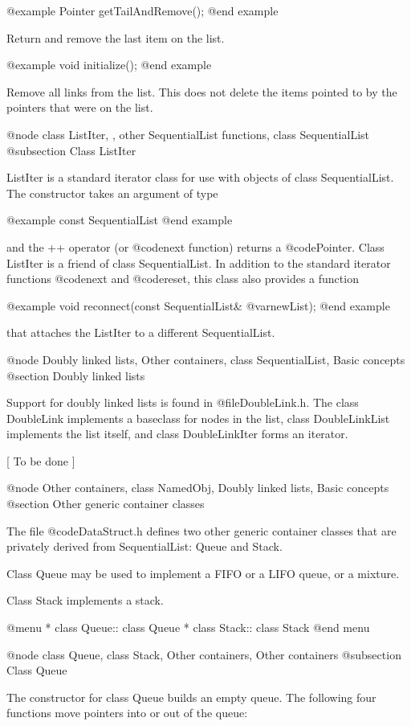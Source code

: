 @example
Pointer getTailAndRemove();
@end example

Return and remove the last item on the list.

@example
void initialize();
@end example

Remove all links from the list.  This does not delete the items pointed
to by the pointers that were on the list.

@node class ListIter,  , other SequentialList functions, class SequentialList
@subsection Class ListIter

ListIter is a standard iterator class for use with objects of class
SequentialList.  The constructor takes an argument of type

@example
const SequentialList
@end example

and the ++ operator (or @code{next} function) returns a @code{Pointer}.
Class ListIter is a friend of class SequentialList.
In addition to the standard iterator functions @code{next} and
@code{reset}, this class also provides a function

@example
void reconnect(const SequentialList& @var{newList});
@end example

that attaches the ListIter to a different SequentialList.

@node Doubly linked lists, Other containers, class SequentialList, Basic concepts
@section Doubly linked lists

Support for doubly linked lists is found in @file{DoubleLink.h}.  The class
DoubleLink implements a baseclass for nodes in the list, class
DoubleLinkList implements the list itself, and class DoubleLinkIter forms an
iterator.

[ To be done ]

@node Other containers, class NamedObj, Doubly linked lists, Basic concepts
@section Other generic container classes

The file @code{DataStruct.h} defines two other generic container classes
that are privately derived from SequentialList: Queue and Stack.

Class Queue may be used to implement a FIFO or a LIFO queue, or a
mixture.

Class Stack implements a stack.

@menu
* class Queue::                 class Queue
* class Stack::                 class Stack
@end menu

@node class Queue, class Stack, Other containers, Other containers
@subsection Class Queue

The constructor for class Queue builds an empty queue.  The following
four functions move pointers into or out of the queue:

